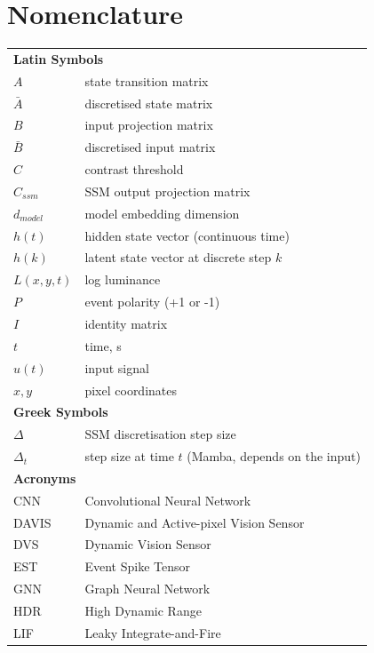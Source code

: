\documentclass[11pt, a4paper]{report}
\begin{document}
\tableofcontents
\clearpage{}
\listoffigures
\clearpage{}
\listoftables

\chapter*{Nomenclature}
\begin{tabular}{ll}
\multicolumn{2}{l}{\textbf{Latin Symbols}} \\[4pt]
$A$ & state transition matrix \\
$\bar{A}$ & discretised state matrix \\
$B$ & input projection matrix \\
$\bar{B}$ & discretised input matrix \\
$C$ & contrast threshold \\
$C_{ssm}$ & SSM output projection matrix \\
$d_{model}$ & model embedding dimension \\
$h(t)$ & hidden state vector (continuous time) \\
$h(k)$ & latent state vector at discrete step $k$ \\
$L(x,y,t)$ & log luminance \\
$P$ & event polarity (+1 or -1) \\
$I$ & identity matrix \\
$t$ & time, s \\
$u(t)$ & input signal \\
$x, y$ & pixel coordinates \\[8pt]
\multicolumn{2}{l}{\textbf{Greek Symbols}} \\[4pt]
$\Delta$ & SSM discretisation step size \\
$\Delta_t$ & step size at time $t$ (Mamba, depends on the input) \\[8pt]
\multicolumn{2}{l}{\textbf{Acronyms}} \\[4pt]
CNN & Convolutional Neural Network \\
DAVIS & Dynamic and Active-pixel Vision Sensor \\
DVS & Dynamic Vision Sensor \\
EST & Event Spike Tensor \\
GNN & Graph Neural Network \\
HDR & High Dynamic Range \\
LIF & Leaky Integrate-and-Fire \\

\end{tabular}
\end{document}
